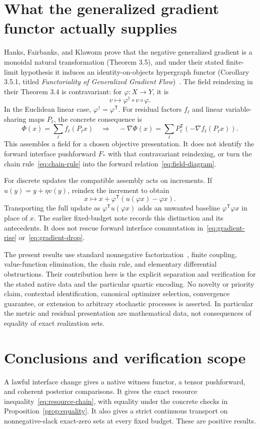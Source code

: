 \documentclass[11pt]{article}
\theoremstyle{remark}
\begin{document}
\section{What the generalized gradient functor actually supplies}\label{sec:prior}
Hanks, Fairbanks, and Klawonn prove that the negative generalized gradient is a monoidal natural transformation (Theorem 3.5), and under their stated finite-limit hypothesis it induces an identity-on-objects hypergraph functor (Corollary 3.5.1, titled \emph{Functoriality of Generalized Gradient Flow})~\cite{Hanks2025}. The field reindexing in their Theorem 3.4 is contravariant: for $\varphi:X\to Y$, it is
\[
 v\longmapsto\varphi^{\dagger}\circ v\circ\varphi.
\]
In the Euclidean linear case, $\varphi^{\dagger}=\varphi^{\mathsf T}$. For residual factors $f_\ell$ and linear variable-sharing maps $P_\ell$, the concrete consequence is
\[
 \Phi(x)=\sum_\ell f_\ell(P_\ell x)
 \quad\Longrightarrow\quad
 -\nabla\Phi(x)=\sum_\ell P_\ell^{\mathsf T}
                         (-\nabla f_\ell(P_\ell x)).
\]
This assembles a field for a chosen objective presentation. It does not identify the forward interface pushforward $F_*$ with that contravariant reindexing, or turn the chain rule~\eqref{eq:chain-rule} into the forward relation~\eqref{eq:field-diagram}.

For discrete updates the compatible assembly acts on increments. If $u(y)=y+\eta v(y)$, reindex the increment to obtain
\[
 x\longmapsto x+\varphi^{\mathsf T}(u(\varphi x)-\varphi x).
\]
Transporting the full update as $\varphi^{\mathsf T}u(\varphi x)$ adds an unwanted baseline $\varphi^{\mathsf T}\varphi x$ in place of $x$. The earlier fixed-budget note records this distinction and its antecedents. It does not rescue forward interface commutation in~\eqref{eq:gradient-rise} or~\eqref{eq:gradient-drop}.

The present results use standard nonnegative factorization~\cite{CohenRothblum}, finite coupling, value-function elimination, the chain rule, and elementary differential obstructions. Their contribution here is the explicit separation and verification for the stated native data and the particular quartic encoding. No novelty or priority claim, contextad identification, canonical optimizer selection, convergence guarantee, or extension to arbitrary stochastic processes is asserted. In particular the metric and residual presentation are mathematical data, not consequences of equality of exact realization sets.

\section{Conclusions and verification scope}\label{sec:verification}
A lawful interface change gives a native witness functor, a tensor pushforward, and coherent posterior comparisons. It gives the exact resource inequality~\eqref{eq:resource-chain}, with equality under the concrete checks in Proposition~\ref{prop:equality}. It also gives a strict continuous transport on nonnegative-slack exact-zero sets at every fixed budget. These are positive results.
\end{document}
